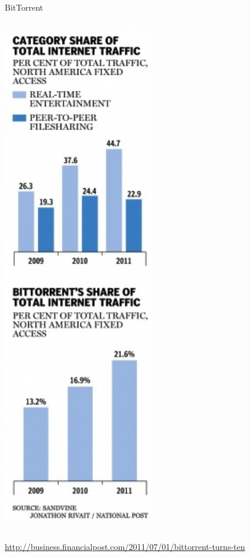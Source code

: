 \begin{frame}{BitTorrent}
\begin{columns}
\begin{column}{0.3\textwidth}
	\includegraphics[width=0.5\textwidth]{p2p-stats2.jpg}\\
\end{column}
\end{columns}
\begin{flushright}
	{\tiny \url{http://business.financialpost.com/2011/07/01/bittorrent-turns-ten}}
\end{flushright}
\end{frame}

